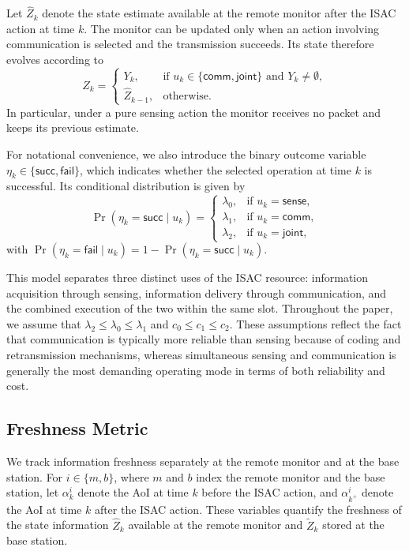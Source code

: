 \documentclass[letterpaper,journal]{IEEEtran}
\begin{document}
Let $\hat Z_k$ denote the state estimate available at the remote monitor after the ISAC action at time $k$. The monitor can be updated only when an action involving communication is selected and the transmission succeeds. Its state therefore evolves according to
\[
\hat Z_k =
\begin{cases}
Y_k, & \text{if } u_k \in \{\mathsf{comm}, \mathsf{joint}\} \text{ and } Y_k \neq \emptyset,\\
\hat Z_{k-1}, & \text{otherwise.}
\end{cases}
\]
In particular, under a pure sensing action the monitor receives no packet and keeps its previous estimate.

For notational convenience, we also introduce the binary outcome variable $\eta_k\in\{\mathsf{succ},\mathsf{fail}\}$, which indicates whether the selected operation at time $k$ is successful. Its conditional distribution is given by
\begin{equation}
\Pr(\eta_k = \mathsf{succ} \mid u_k) =
\begin{cases}
\lambda_0, & \text{if } u_k = \mathsf{sense},\\
\lambda_1, & \text{if } u_k = \mathsf{comm},\\
\lambda_2, & \text{if } u_k = \mathsf{joint},
\end{cases}
\end{equation}
with $\Pr(\eta_k = \mathsf{fail} \mid u_k) = 1 - \Pr(\eta_k = \mathsf{succ} \mid u_k)$.

This model separates three distinct uses of the ISAC resource: information acquisition through sensing, information delivery through communication, and the combined execution of the two within the same slot. Throughout the paper, we assume that $\lambda_2\leq \lambda_0\leq \lambda_1$ and $c_0\leq c_1\leq c_2$. These assumptions reflect the fact that communication is typically more reliable than sensing because of coding and retransmission mechanisms, whereas simultaneous sensing and communication is generally the most demanding operating mode in terms of both reliability and cost.



\subsection{Freshness Metric}

We track information freshness separately at the remote monitor and at the base station. For $i \in \{m,b\}$, where $m$ and $b$ index the remote monitor and the base station, let $\alpha^i_k$ denote the AoI at time $k$ before the ISAC action, and $\alpha^i_{k^+}$ denote the AoI at time $k$ after the ISAC action. These variables quantify the freshness of the state information $\hat Z_k$ available at the remote monitor and $\tilde Z_k$ stored at the base station.
\end{document}
